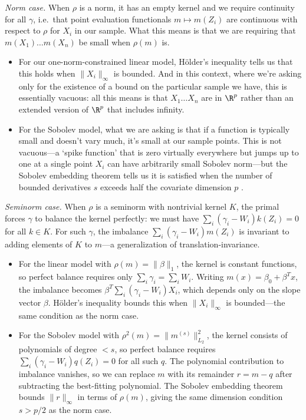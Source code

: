 \documentclass{article}
\begin{document}
\emph{Norm case.} When $\rho$ is a norm, it has an empty kernel and we require continuity for all $\gamma$, i.e.\ that point evaluation functionals $m \mapsto m(Z_i)$ are continuous with respect to $\rho$ for $X_i$ in our sample. What this means is that we are requiring that $m(X_1) \ldots m(X_n)$ be small when $\rho(m)$ is.
\begin{itemize}
\item For our one-norm-constrained linear model, H\"older's inequality tells us that this holds when $\|X_i\|_\infty$ is bounded. And in this context, where we're asking only for the existence of a bound on the particular sample we have, this is essentially vacuous: all this means is that $X_1 \ldots X_n$ are in $\R^p$ rather than an extended version of $\R^p$ that includes infinity.
\item For the Sobolev model, what we are asking is that if a function is typically small and doesn't vary much, it's small at our sample points. This is not vacuous---a `spike function' that is zero virtually everywhere but jumps up to one at a single point $X_i$ can have arbitrarily small Sobolev norm---but the Sobolev embedding theorem tells us it is satisfied when the number of bounded derivatives $s$ exceeds half the covariate dimension $p$ \citep[Theorem 4.12]{adams2003sobolev}.
\end{itemize}
\emph{Seminorm case.} When $\rho$ is a seminorm with nontrivial kernel $K$, the primal forces $\gamma$ to balance the kernel perfectly: we must have $\sum_i (\gamma_i - W_i) k(Z_i) = 0$ for all $k \in K$. For such $\gamma$, the imbalance $\sum_i (\gamma_i - W_i) m(Z_i)$ is invariant to adding elements of $K$ to $m$---a generalization of translation-invariance.
\begin{itemize}
\item For the linear model with $\rho(m) = \|\beta\|_1$, the kernel is constant functions, so perfect balance requires only $\sum_i \gamma_i = \sum_i W_i$. Writing $m(x) = \beta_0 + \beta^T x$, the imbalance becomes $\beta^T \sum_i (\gamma_i - W_i) X_i$, which depends only on the slope vector $\beta$. H\"older's inequality bounds this when $\|X_i\|_\infty$ is bounded---the same condition as the norm case.
\item For the Sobolev model with $\rho^2(m) = \|m^{(s)}\|_{L_2}^2$, the kernel consists of polynomials of degree $< s$, so perfect balance requires $\sum_i (\gamma_i - W_i) q(Z_i) = 0$ for all such $q$. The polynomial contribution to imbalance vanishes, so we can replace $m$ with its remainder $r = m - q$ after subtracting the best-fitting polynomial. The Sobolev embedding theorem bounds $\|r\|_\infty$ in terms of $\rho(m)$, giving the same dimension condition $s > p/2$ as the norm case.
\end{itemize}
\end{document}

